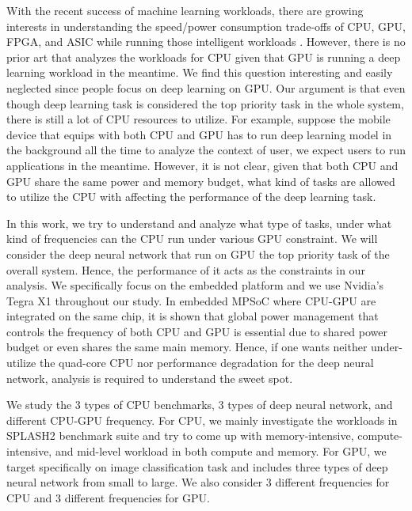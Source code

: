 With the recent success of machine learning workloads, there are growing interests in understanding the speed/power consumption trade-offs of CPU, GPU, FPGA, and ASIC while running those intelligent workloads \cite{malik2016architecture, nurvitadhi2016accelerating}. However, there is no prior art that analyzes the workloads for CPU given that GPU is running a deep learning workload in the meantime. We find this question interesting and easily neglected since people focus on deep learning on GPU. Our argument is that even though deep learning task is considered the top priority task in the whole system, there is still a lot of CPU resources to utilize. For example, suppose the mobile device that equips with both CPU and GPU has to run deep learning model in the background all the time to analyze the context of user, we expect users to run applications in the meantime. However, it is not clear, given that both CPU and GPU share the same power and memory budget, what kind of tasks are allowed to utilize the CPU with affecting the performance of the deep learning task.

In this work, we try to understand and analyze what type of tasks, under what kind of frequencies can the CPU run under various GPU constraint. We will consider the deep neural network that run on GPU the top priority task of the overall system. Hence, the performance of it acts as the constraints in our analysis. We specifically focus on the embedded platform and we use Nvidia's Tegra X1 throughout our study. In embedded MPSoC where CPU-GPU are integrated on the same chip, it is shown that global power management that controls the frequency of both CPU and GPU is essential due to shared power budget \cite{pathania2014integrated} or even shares the same main memory. Hence, if one wants neither under-utilize the quad-core CPU nor performance degradation for the deep neural network, analysis is required to understand the sweet spot.

We study the 3 types of CPU benchmarks, 3 types of deep neural network, and different CPU-GPU frequency. For CPU, we mainly investigate the workloads in SPLASH2 benchmark suite \cite{woo1995splash} and try to come up with memory-intensive, compute-intensive, and mid-level workload in both compute and memory. For GPU, we target specifically on image classification task and includes three types of deep neural network from small to large. We also consider 3 different frequencies for CPU and 3 different frequencies for GPU.
